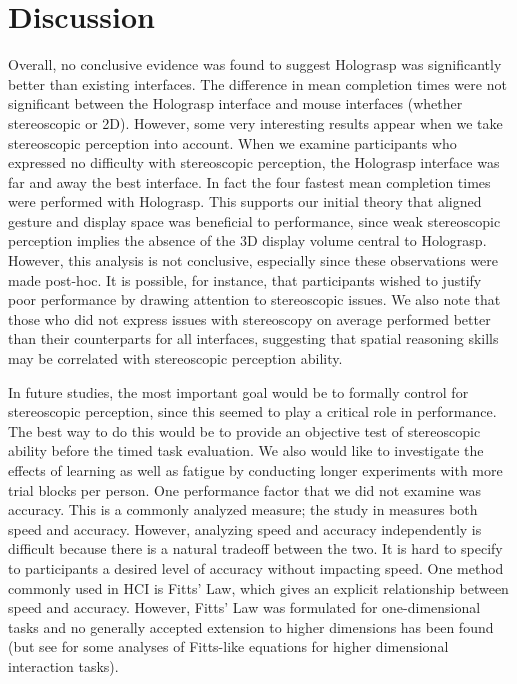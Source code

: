 \documentclass[pageno]{jpaper}
\begin{document}
\newpage
\section{Discussion}
\label{sec:discussion}
Overall, no conclusive evidence was found to suggest Holograsp was significantly better than existing interfaces. The difference in mean
completion times were not significant between the Holograsp interface and mouse interfaces (whether stereoscopic or 2D). However, some very
interesting results appear when we take stereoscopic perception into account. When we examine participants who expressed no difficulty with
stereoscopic perception, the Holograsp interface was far and away the best interface. In fact the four fastest mean completion times were
performed with Holograsp. This supports our initial theory that aligned gesture and display space was beneficial to performance, since weak
stereoscopic perception implies the absence of the 3D display volume central to Holograsp. However, this analysis is not conclusive, especially since these observations
were made post-hoc. It is possible, for instance, that participants wished to justify poor performance by drawing attention to stereoscopic issues.
We also note that those who did not express issues with stereoscopy on average performed better than their counterparts for all interfaces, suggesting
that spatial reasoning skills may be correlated with stereoscopic perception ability.

In future studies, the most important goal would be to formally
control for stereoscopic perception, since this seemed to play a critical role in performance. The best way to do this
would be to provide an objective test of stereoscopic ability before the timed task evaluation. We also
would like to investigate the effects of learning as well as fatigue by conducting longer experiments with
more trial blocks per person. One performance factor that we did not examine was accuracy. This is a commonly analyzed measure; the study in \cite{study1}
measures both speed and accuracy. However, analyzing speed and accuracy independently is difficult because
there is a natural tradeoff between the two. It is hard to specify to participants a desired level of accuracy without impacting speed.
One method commonly used in HCI is Fitts' Law, which gives an explicit relationship between
speed and accuracy. However, Fitts' Law was formulated for one-dimensional tasks and no generally accepted extension
to higher dimensions has been found (but see \cite{mackenzie1992extending, monk1985fitts, murata2001extending} for some analyses of Fitts-like equations for higher
dimensional interaction tasks). 
\end{document}
